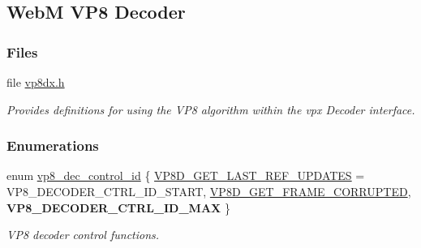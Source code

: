 \hypertarget{group__vp8__decoder}{
\subsection{\-Web\-M \-V\-P8 \-Decoder}
\label{group__vp8__decoder}
}
\subsubsection*{\-Files}
\begin{DoxyCompactItemize}
\item 
file \hyperlink{vp8dx_8h}{vp8dx.\-h}
\begin{DoxyCompactList}\small\item\em \-Provides definitions for using the \-V\-P8 algorithm within the vpx \-Decoder interface. \end{DoxyCompactList}\end{DoxyCompactItemize}
\subsubsection*{\-Enumerations}
\begin{DoxyCompactItemize}
\item 
enum \hyperlink{group__vp8__decoder_gaf9dd3f2e6d1412106ee791af768e57c1}{vp8\-\_\-dec\-\_\-control\-\_\-id} \{ \hyperlink{group__vp8__decoder_ggaf9dd3f2e6d1412106ee791af768e57c1a0b6055c47120f28e3de959960ee0a02b}{\-V\-P8\-D\-\_\-\-G\-E\-T\-\_\-\-L\-A\-S\-T\-\_\-\-R\-E\-F\-\_\-\-U\-P\-D\-A\-T\-E\-S} =  \-V\-P8\-\_\-\-D\-E\-C\-O\-D\-E\-R\-\_\-\-C\-T\-R\-L\-\_\-\-I\-D\-\_\-\-S\-T\-A\-R\-T, 
\hyperlink{group__vp8__decoder_ggaf9dd3f2e6d1412106ee791af768e57c1af9f82d9e7930e6a2244b30b031b79599}{\-V\-P8\-D\-\_\-\-G\-E\-T\-\_\-\-F\-R\-A\-M\-E\-\_\-\-C\-O\-R\-R\-U\-P\-T\-E\-D}, 
{\bfseries \-V\-P8\-\_\-\-D\-E\-C\-O\-D\-E\-R\-\_\-\-C\-T\-R\-L\-\_\-\-I\-D\-\_\-\-M\-A\-X}
 \}
\begin{DoxyCompactList}\small\item\em \-V\-P8 decoder control functions. \end{DoxyCompactList}\end{DoxyCompactItemize}
